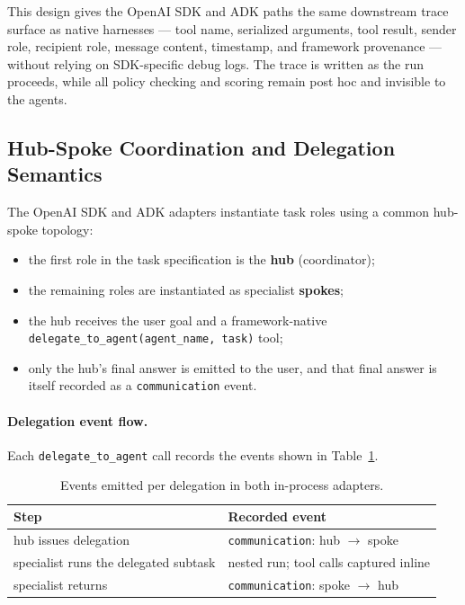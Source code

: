 This design gives the OpenAI SDK and ADK paths the same downstream
trace surface as native harnesses --- tool name, serialized arguments,
tool result, sender role, recipient role, message content, timestamp,
and framework provenance --- without relying on SDK-specific debug
logs. The trace is written as the run proceeds, while all policy
checking and scoring remain post hoc and invisible to the agents.

\subsection{Hub-Spoke Coordination and Delegation Semantics}
\label{app:framework-adapters:hub-spoke}

The OpenAI SDK and ADK adapters instantiate task roles using a common
hub-spoke topology:
\begin{itemize}[leftmargin=1.2em, itemsep=2pt]
  \item the first role in the task specification is the \textbf{hub}
  (coordinator);
  \item the remaining roles are instantiated as specialist
  \textbf{spokes};
  \item the hub receives the user goal and a framework-native
  \texttt{delegate\_to\_agent(agent\_name, task)} tool;
  \item only the hub's final answer is emitted to the user, and that
  final answer is itself recorded as a \texttt{communication} event.
\end{itemize}

\paragraph{Delegation event flow.}
Each \texttt{delegate\_to\_agent} call records the events shown in
Table~\ref{tab:delegation_events}.

\begin{table}[h]
\centering
\small
\setlength{\tabcolsep}{6pt}
\renewcommand{\arraystretch}{1.2}
\caption{Events emitted per delegation in both in-process adapters.}
\label{tab:delegation_events}
\begin{tabular}{@{}p{6.0cm}p{6.4cm}@{}}
\toprule
\textbf{Step} & \textbf{Recorded event} \\
\midrule
hub issues delegation                  & \texttt{communication}: hub $\rightarrow$ spoke \\
specialist runs the delegated subtask  & nested run; tool calls captured inline \\
specialist returns                     & \texttt{communication}: spoke $\rightarrow$ hub \\
\bottomrule
\end{tabular}
\end{table}

